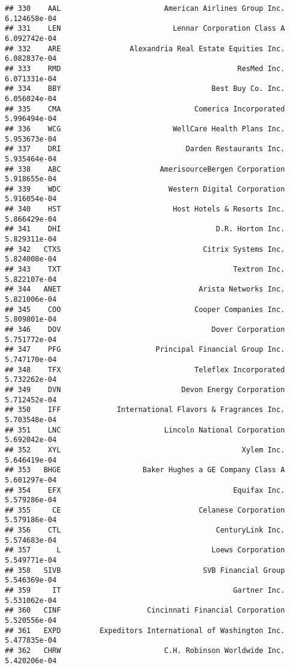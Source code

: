 \documentclass[
]{article}
\begin{document}
\begin{verbatim}
## 330    AAL                        American Airlines Group Inc. 6.124658e-04
## 331    LEN                          Lennar Corporation Class A 6.092742e-04
## 332    ARE                Alexandria Real Estate Equities Inc. 6.082837e-04
## 333    RMD                                         ResMed Inc. 6.071331e-04
## 334    BBY                                   Best Buy Co. Inc. 6.056024e-04
## 335    CMA                               Comerica Incorporated 5.996494e-04
## 336    WCG                          WellCare Health Plans Inc. 5.953673e-04
## 337    DRI                             Darden Restaurants Inc. 5.935464e-04
## 338    ABC                       AmerisourceBergen Corporation 5.918655e-04
## 339    WDC                         Western Digital Corporation 5.916054e-04
## 340    HST                          Host Hotels & Resorts Inc. 5.866429e-04
## 341    DHI                                    D.R. Horton Inc. 5.829311e-04
## 342   CTXS                                 Citrix Systems Inc. 5.824008e-04
## 343    TXT                                        Textron Inc. 5.822107e-04
## 344   ANET                                Arista Networks Inc. 5.821006e-04
## 345    COO                               Cooper Companies Inc. 5.809801e-04
## 346    DOV                                   Dover Corporation 5.751772e-04
## 347    PFG                      Principal Financial Group Inc. 5.747170e-04
## 348    TFX                               Teleflex Incorporated 5.732262e-04
## 349    DVN                            Devon Energy Corporation 5.712452e-04
## 350    IFF             International Flavors & Fragrances Inc. 5.703548e-04
## 351    LNC                        Lincoln National Corporation 5.692042e-04
## 352    XYL                                          Xylem Inc. 5.646419e-04
## 353   BHGE                   Baker Hughes a GE Company Class A 5.601297e-04
## 354    EFX                                        Equifax Inc. 5.579286e-04
## 355     CE                                Celanese Corporation 5.579186e-04
## 356    CTL                                    CenturyLink Inc. 5.574683e-04
## 357      L                                   Loews Corporation 5.549771e-04
## 358   SIVB                                 SVB Financial Group 5.546369e-04
## 359     IT                                        Gartner Inc. 5.531062e-04
## 360   CINF                    Cincinnati Financial Corporation 5.520556e-04
## 361   EXPD         Expeditors International of Washington Inc. 5.477835e-04
## 362   CHRW                        C.H. Robinson Worldwide Inc. 5.420206e-04

\end{verbatim}
\end{document}
